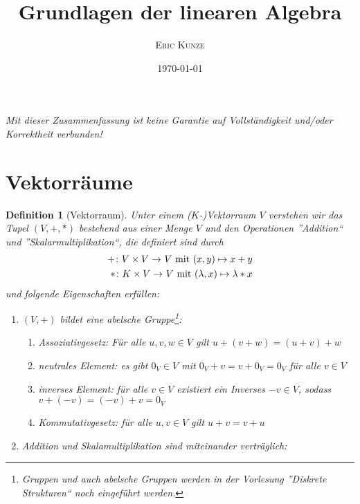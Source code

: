 \documentclass[ngerman, a4paper, 12pt]{article}
\newcounter{themcount}
\theoremstyle{plain}
\newtheorem{definition}[themcount]{Definition}
\theoremstyle{nonumberplain}
\begin{document}
	\title{\bfseries \sffamily \huge Grundlagen der linearen Algebra}
	\author{\scshape Eric Kunze}
	\date{\today}
	\maketitle
	{ \footnotesize \doclicenseThis }
	
	\begin{center}
		\small \slshape Mit dieser Zusammenfassung ist keine Garantie auf Vollständigkeit und/oder Korrektheit verbunden!
	\end{center}
	
\section{Vektorräume}
	
	\begin{definition}[Vektorraum]
		Unter einem ($K$-)Vektorraum $V$ verstehen wir das Tupel $(V,+,*)$ bestehend aus einer Menge $V$ und den Operationen ''Addition`` und ''Skalarmultiplikation``, die definiert sind durch
		\begin{equation*}
			\begin{aligned}
				\abb{+}{V \times V}{V} \mit (x,y) \mapsto x + y \\
				\abb{*}{K \times V}{V} \mit (\lambda , x) \mapsto \lambda * x
			\end{aligned}
		\end{equation*}
		und folgende Eigenschaften erfüllen:
		\begin{enumerate}[label=(V\arabic*), leftmargin=*]
			\item $(V,+)$ bildet eine abelsche Gruppe\footnote{Gruppen und auch abelsche Gruppen werden in der Vorlesung ''Diskrete Strukturen`` noch eingeführt werden.}:
			\begin{enumerate}[label=(\alph*), noitemsep]
				\item \textit{Assoziativgesetz}: Für alle $u,v,w \in V$ gilt $u + (v + w) = (u + v) + w$
				\item \textit{neutrales Element}: es gibt $0_V \in V$ mit $0_V + v = v + 0_V = 0_V$ für alle $v \in V$
				\item \textit{inverses Element}: für alle $v \in V$ existiert ein Inverses $-v \in V$, sodass $v + (-v) = (-v) + v = 0_V$
				\item \textit{Kommutativgesetz}: für alle $u,v \in V$ gilt $u + v = v + u$
			\end{enumerate}
		\item Addition und Skalamultiplikation sind miteinander verträglich: 

\end{enumerate}
\end{definition}
\end{document}
